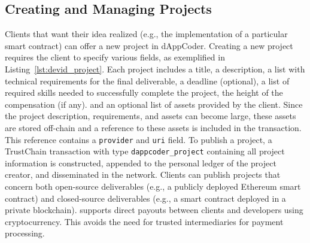 \subsection{Creating and Managing Projects}
Clients that want their idea realized (e.g., the implementation of a particular smart contract) can offer a new project in dAppCoder.
Creating a new project requires the client to specify various fields, as exemplified in Listing~\ref{lst:devid_project}.
Each project includes a title, a description, a list with technical requirements for the final deliverable, a deadline (optional), a list of required skills needed to successfully complete the project, the height of the compensation (if any). and an optional list of assets provided by the client.
Since the project description, requirements, and assets can become large, these assets are stored off-chain and a reference to these assets is included in the transaction.
This reference contains a \texttt{provider} and \texttt{uri} field.
To publish a project, a TrustChain transaction with type \texttt{dappcoder\_project} containing all project information is constructed, appended to the personal ledger of the project creator, and disseminated in the network.
Clients can publish projects that concern both open-source deliverables (e.g., a publicly deployed Ethereum smart contract) and closed-source deliverables (e.g., a smart contract deployed in a private blockchain).
\Dappcoder{} supports direct payouts between clients and developers using cryptocurrency.
This avoids the need for trusted intermediaries for payment processing.


